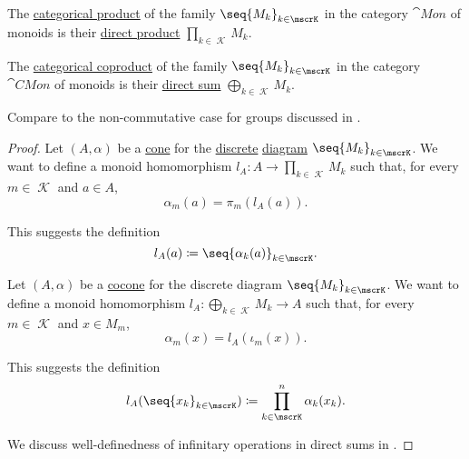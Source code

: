 \begin{proposition}\label{thm:monoid_categorical_limits}
  \hfill
  \begin{thmenum}
     The \hyperref[def:discrete_category_limits]{categorical product} of the family \( \seq{ M_k }_{k \in \mscrK} \) in the category \hyperref[def:monoid/category]{\( \cat{Mon} \)} of monoids is their \hyperref[def:first_order_direct_product]{direct product} \( \prod_{k \in \mscrK} M_k \).

     The \hyperref[def:discrete_category_limits]{categorical coproduct} of the family \( \seq{ M_k }_{k \in \mscrK} \) in the category \hyperref[def:monoid/category]{\( \cat{CMon} \)} of  monoids is their \hyperref[def:direct_sum]{direct sum} \( \bigoplus_{k \in \mscrK} M_k \).
  \end{thmenum}
\end{proposition}
\begin{comments}
  \item Compare  to the non-commutative case for groups discussed in .
\end{comments}
\begin{proof}
   Let \( (A, \alpha) \) be a \hyperref[def:category_of_cones/cone]{cone} for the \hyperref[def:discrete_category]{discrete} \hyperref[def:categorical_diagram]{diagram} \( \seq{ M_k }_{k \in \mscrK} \). We want to define a monoid homomorphism \( l_A: A \to \prod_{k \in \mscrK} M_k \) such that, for every \( m \in \mscrK \) and \( a \in A \),
  \begin{equation*}
    \alpha_m(a) = \pi_m(l_A(a)).
  \end{equation*}

  This suggests the definition
  \begin{equation*}
    l_A(a) \coloneqq \seq{ \alpha_k(a) }_{k \in \mscrK}.
  \end{equation*}

    Let \( (A, \alpha) \) be a \hyperref[def:category_of_cones/cocone]{cocone} for the discrete diagram \( \seq{ M_k }_{k \in \mscrK} \). We want to define a monoid homomorphism \( l_A: \bigoplus_{k \in \mscrK} M_k \to A \) such that, for every \( m \in \mscrK \) and \( x \in M_m \),
  \begin{equation*}
    \alpha_m(x) = l_A(\iota_m(x)).
  \end{equation*}

  This suggests the definition
  \begin{equation*}
    l_A(\seq{ x_k }_{k \in \mscrK}) \coloneqq \prod_{k \in \mscrK}^n \alpha_k(x_k).
  \end{equation*}

  We discuss well-definedness of infinitary operations in direct sums in .
\end{proof}
